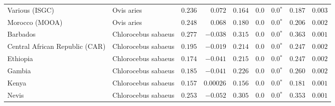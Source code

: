 \begin{center}
\begin{adjustbox}{width = 1\textwidth}
\begin{tabular}{|l|l|r|r|r|r|r|r|r|}
                 Various (ISGC) &           Ovis aries &                                        $ 0.236$ &                                           $ 0.072$ &                      $ 0.164$ &            $0.0$ &                  $\bm{0.0{^*}}$ &                                           $ 0.187$ &           $ 0.003$ \\
                 Morocco (MOOA) &           Ovis aries &                                        $ 0.248$ &                                           $ 0.068$ &                      $ 0.180$ &            $0.0$ &                  $\bm{0.0{^*}}$ &                                           $ 0.206$ &           $ 0.002$ \\
                       Barbados &  Chlorocebus sabaeus &                                        $ 0.277$ &                                           $-0.038$ &                      $ 0.315$ &            $0.0$ &                  $\bm{0.0{^*}}$ &                                           $ 0.363$ &           $ 0.001$ \\
 Central African Republic (CAR) &  Chlorocebus sabaeus &                                        $ 0.195$ &                                           $-0.019$ &                      $ 0.214$ &            $0.0$ &                  $\bm{0.0{^*}}$ &                                           $ 0.247$ &           $ 0.002$ \\
                       Ethiopia &  Chlorocebus sabaeus &                                        $ 0.174$ &                                           $-0.041$ &                      $ 0.215$ &            $0.0$ &                  $\bm{0.0{^*}}$ &                                           $ 0.247$ &           $ 0.002$ \\
                         Gambia &  Chlorocebus sabaeus &                                        $ 0.185$ &                                           $-0.041$ &                      $ 0.226$ &            $0.0$ &                  $\bm{0.0{^*}}$ &                                           $ 0.260$ &           $ 0.002$ \\
                          Kenya &  Chlorocebus sabaeus &                                        $ 0.157$ &                                          $0.00026$ &                      $ 0.156$ &            $0.0$ &                  $\bm{0.0{^*}}$ &                                           $ 0.181$ &           $ 0.001$ \\
                          Nevis &  Chlorocebus sabaeus &                                        $ 0.253$ &                                           $-0.052$ &                      $ 0.305$ &            $0.0$ &                  $\bm{0.0{^*}}$ &                                           $ 0.353$ &           $ 0.001$ \\

\end{tabular}
\end{adjustbox}
\end{center}
